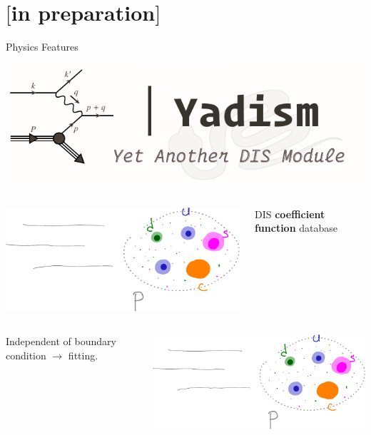 \documentclass[9pt]{beamer}
\providecommand{\iRef}[1]{{\color{mLightGreen}\small $[$#1$]$}}
\begin{document}
\section{\yadism{} \iRef{in preparation}}

\begin{frame}{\yadism{} Physics Features}
	\begin{center}
		\includegraphics[width=.4\linewidth]{yadism.pdf}
	\end{center}

    \begin{columns}
        \begin{column}{0.5\textwidth}
            \begin{center}
                \includegraphics[width=0.6\linewidth]{intrinsic}
            \end{center}
        \end{column}
        \begin{column}{0.4\textwidth}
            DIS \textbf{coefficient function} database
        \end{column}
    \end{columns}

    \begin{columns}
        \begin{column}{0.4\textwidth}
            Independent of boundary condition $\to$ \pdf fitting.
        \end{column}
        \begin{column}{0.5\textwidth}
            \begin{center}
                \includegraphics[width=0.6\linewidth]{intrinsic}
            \end{center}
        \end{column}
    \end{columns}


\end{frame}
\end{document}
